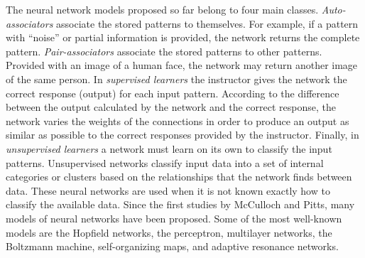 The neural network models proposed so far belong to four main classes. \textit{Auto-associators} associate the stored patterns to themselves. For example, if a pattern with ``noise'' or partial information is provided, the network returns the complete pattern. \textit{Pair-associators} associate the stored patterns to other patterns. Provided with an image of a human face, the network may return another image of the same person. In \textit{supervised learners} the instructor gives the network the correct response (output) for each input pattern. According to the difference between the output calculated by the network and the correct response, the network varies the weights of the connections in order to produce an output as similar as possible to the correct responses provided by the instructor. Finally, in \textit{unsupervised learners} a network must learn on its own to classify the input patterns. Unsupervised networks classify input data into a set of internal categories or clusters based on the relationships that the network finds between data. These neural networks are used when it is not known exactly how to classify the available data. Since the first studies by McCulloch and Pitts, many models of neural networks have been proposed. Some of the most well-known models are the Hopfield networks, the perceptron, multilayer networks, the Boltzmann machine, self-organizing maps, and adaptive resonance networks.

